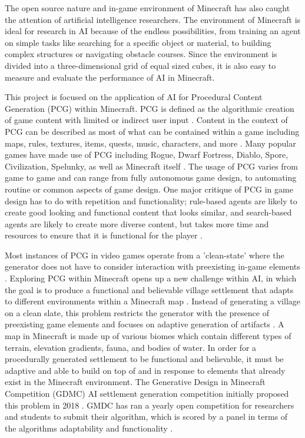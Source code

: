 \documentclass[11pt, oneside]{article}
\begin{document}
\begin{normalsize}
The open source nature and in-game environment of Minecraft has also caught the attention of artificial intelligence researchers. The environment of Minecraft is ideal for research in AI because of the endless possibilities, from training an agent on simple tasks like searching for a specific object or material, to building complex structures or navigating obstacle courses. Since the environment is divided into a three-dimensional grid of equal sized cubes, it is also easy to measure and evaluate the performance of AI in Minecraft.

This project is focused on the application of AI for Procedural Content Generation (PCG) within Minecraft. PCG is defined as the algorithmic creation of game content with limited or indirect user input \cite{shaker2016procedural}. Content in the context of PCG can be described as most of what can be contained within a game including maps, rules, textures, items, quests, music, characters, and more \cite{shaker2016procedural}. Many popular games have made use of PCG including Rogue, Dwarf Fortress, Diablo, Spore, Civilization, Spelunky, as well as Minecraft itself \cite{shaker2016procedural}. The usage of PCG varies from game to game and can range from fully autonomous game design, to  automating routine or common aspects of game design. One major critique of PCG in game design has to do with repetition and functionality; rule-based agents are likely to create good looking and functional content that looks similar, and search-based agents are likely to create more diverse content, but takes more time and resources to ensure that it is functional for the player \cite{green_organic_2019}.

Most instances of PCG in video games operate from a 'clean-state' where the generator does not have to consider interaction with preexisting in-game elements \cite{green_organic_2019}. Exploring PCG within Minecraft opens up a new challenge within AI, in which the goal is to produce a functional and believable village settlement that adapts to different environments within a Minecraft map \cite{salge_generative_2019}. Instead of generating a village on a clean slate, this problem restricts the generator with the presence of preexisting game elements and focuses on adaptive generation of artifacts \cite{green_organic_2019}. A map in Minecraft is made up of various biomes which contain different types of terrain, elevation gradients, fauna, and bodies of water. In order for a procedurally generated settlement to be functional and believable, it must be adaptive and able to build on top of and in response to elements that already exist in the Minecraft environment. The Generative Design in Minecraft Competition (GDMC) AI settlement generation competition initially proposed this problem in 2018 \cite{salge_generative_2018}. GMDC has ran a yearly open competition for researchers and students to submit their algorithm, which is scored by a panel in terms of the algorithms adaptability and functionality \cite{fridh_settlement_nodate}. 


\end{normalsize}
\end{document}
